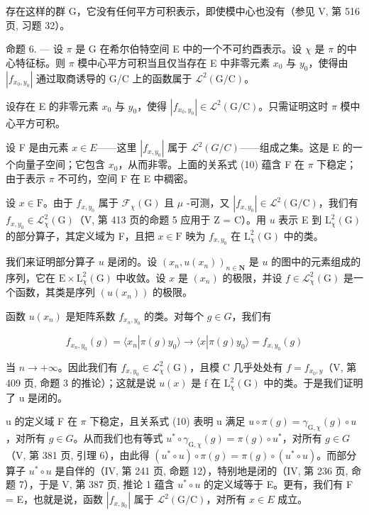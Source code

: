 存在这样的群 G，它没有任何平方可积表示，即使模中心也没有（参见 V, 第 516 页, 习题 32）。

命题 6. --- 设 \(\pi\) 是 G 在希尔伯特空间 E 中的一个不可约酉表示。设 \(\chi\) 是 \(\pi\) 的中心特征标。则 \(\pi\) 模中心平方可积当且仅当存在 E 中非零元素 \(x_0\) 与 \(y_0\)，使得由 \(|f_{x_0,y_0}|\) 通过取商诱导的 G/C 上的函数属于 \(\mathcal{L}^2 (\mathrm{G / C})\)。

设存在 E 的非零元素 \(x_{0}\) 与 \(y_{0}\)，使得 \(|f_{x_{0},y_{0}}| \in \mathcal{L}^{2}(\mathrm{G/C})\)。只需证明这时 \(\pi\) 模中心平方可积。

 设 F 是由元素 \(x \in E\)——这里 \(|f_{x,y_{0}}|\) 属于 \(\mathcal{L}^{2}(G/C)\)——组成之集。这是 E 的一个向量子空间；它包含 \(x_{0}\)，从而非零。上面的关系式 (10) 蕴含 F 在 \(\pi\) 下稳定；由于表示 \(\pi\) 不可约，空间 F 在 E 中稠密。

 设 \(x \in \mathrm{F}\)。由于 \(f_{x,y_0}\) 属于 \(\mathcal{F}_{\chi}(\mathrm{G})\) 且 \(\mu\) -可测，又 \(|f_{x,y_0}| \in \mathcal{L}^2(\mathrm{G/C})\)，我们有 \(f_{x,y_0} \in \mathcal{L}_{\chi}^2(\mathrm{G})\)（V, 第 413 页的命题 5 应用于 Z = C）。用 \(u\) 表示 E 到 \(\mathrm{L}_{\chi}^{2}(\mathrm{G})\) 的部分算子，其定义域为 F，且把 \(x \in \mathrm{F}\) 映为 \(f_{x,y_0}\) 在 \(\mathrm{L}_{\chi}^{2}(\mathrm{G})\) 中的类。

 我们来证明部分算子 \(u\) 是闭的。设 \((x_{n}, u(x_{n}))_{n \in \mathbf{N}}\) 是 \(u\) 的图中的元素组成的序列，它在 \(\mathrm{E} \times \mathrm{L}_{\chi}^{2}(\mathrm{G})\) 中收敛。设 \(x\) 是 \((x_{n})\) 的极限，并设 \(f \in \mathcal{L}_{\chi}^{2}(\mathrm{G})\) 是一个函数，其类是序列 \((u(x_{n}))\) 的极限。

函数 \(u(x_{n})\) 是矩阵系数 \(f_{x_{n},y_{0}}\) 的类。对每个 \(g \in G\)，我们有

\[
f _ {x _ {n}, y _ {0}} (g) = \langle x _ {n} | \pi (g) y _ {0} \rangle \rightarrow \langle x | \pi (g) y _ {0} \rangle = f _ {x, y _ {0}} (g)
\]

当 \(n \to +\infty\)。因此我们有 \(f_{x,y_{0}} \in \mathcal{L}_{\chi}^{2}(\mathrm{G})\)，且模 C 几乎处处有 \(f = f_{x_{0},y}\)（V, 第 409 页, 命题 3 的推论）；这就是说 \(u(x)\) 是 f 在 \(\mathrm{L}_{\chi}^{2}(\mathrm{G})\) 中的类。于是我们证明了 u 是闭的。

u 的定义域 F 在 \(\pi\) 下稳定，且关系式 (10) 表明 u 满足 \(u \circ \pi(g) = \gamma_{\mathrm{G},\chi}(g) \circ u\)，对所有 \(g \in G\)。从而我们也有等式 \(u^{*} \circ \gamma_{\mathrm{G},\chi}(g) = \pi(g) \circ u^{*}\)，对所有 \(g \in G\)（V, 第 381 页, 引理 6），由此得 \((u^{*} \circ u) \circ \pi(g) = \pi(g) \circ (u^{*} \circ u)\)。而部分算子 \(u^{*} \circ u\) 是自伴的（IV, 第 241 页, 命题 12），特别地是闭的（IV, 第 236 页, 命题 7），于是 V, 第 387 页, 推论 1 蕴含 \(u^{*} \circ u\) 的定义域等于 E。更有，我们有 F = E，也就是说，函数 \(|f_{x,y_{0}}|\) 属于 \(\mathcal{L}^{2}(\mathrm{G}/\mathrm{C})\)，对所有 \(x \in E\) 成立。

